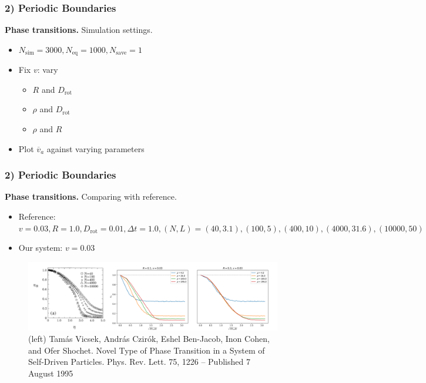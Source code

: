 \begin{frame}
	\frametitle{2) Periodic Boundaries}
	\textbf{Phase transitions.} Simulation settings.
	\begin{itemize}
	    \item $N_{\text{sim}} = 3000, N_{\text{eq}} = 1000, N_{\text{save}} = 1$ 
	    \item Fix $v$: vary
	    	\begin{itemize}
	    		\item $R$ and $D_{\text{rot}}$
	    		\item $\rho$ and $D_{\text{rot}}$
	    		\item $\rho$ and $R$
	    	\end{itemize}
	    \item Plot $\overline{v}_a$ against varying parameters
	\end{itemize}
\end{frame}

\begin{frame}
	\frametitle{2) Periodic Boundaries}
	\textbf{Phase transitions.} Comparing with reference.
	\begin{itemize}
	    \item Reference: $v = 0.03, R = 1.0, D_{\text{rot}} = 0.01, \Delta t = 1.0, \left(N,L\right) = \left(40,3.1\right), \left(100,5\right), \left(400,10\right), \left(4000,31.6\right), \left(10000,50\right)$
	    \item Our system: $v = 0.03$
	\end{itemize}
	\begin{figure}[H]
  		\includegraphics[width=\textwidth]{images/chapter2/va_against_eta_reference.png} 
  		\caption*{(left) Tamás Vicsek, András Czirók, Eshel Ben-Jacob, Inon Cohen, and Ofer Shochet. Novel Type of Phase Transition in a System of Self-Driven Particles. Phys. Rev. Lett. 75, 1226 – Published 7 August 1995}
	\end{figure}
\end{frame}

